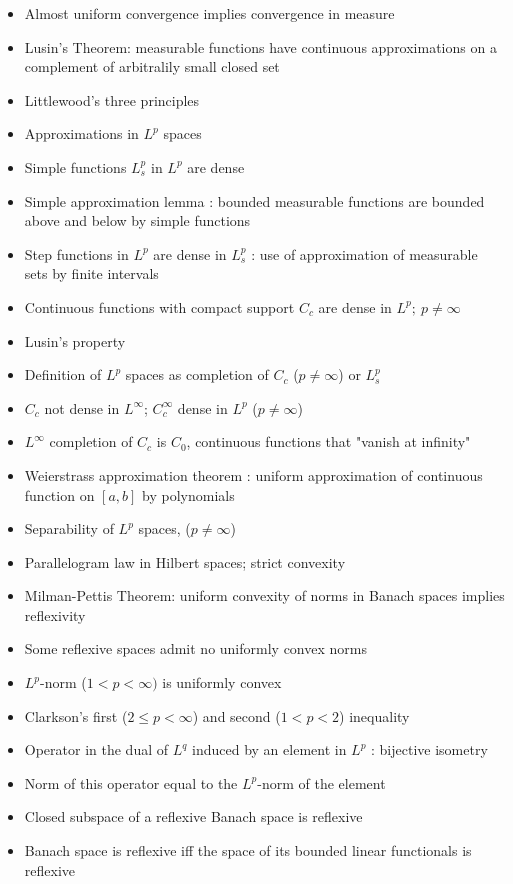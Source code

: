 \documentclass[12pt]{article}
\begin{document}
\begin{itemize}
    \item Almost uniform convergence implies convergence in measure
    \item Lusin's Theorem: measurable functions have continuous approximations on a complement of arbitralily small closed set
    \item Littlewood's three principles
    \item Approximations in $L^p$ spaces
    \item Simple functions $L^p_s$ in $L^p$ are dense
    \item Simple approximation lemma : bounded measurable functions are bounded above and below by simple functions
    \item Step functions in $L^p$ are dense in $L^p_s$ : use of approximation of measurable sets by finite intervals
    \item Continuous functions with compact support $C_c$ are dense in $L^p;\ p\neq \infty$
    \item Lusin's property
    \item Definition of $L^p$ spaces as completion of $C_c$ ($p\neq \infty$) or $L^p_s$
    \item $C_c$ not dense in $L^\infty$; $C_c^\infty$ dense in $L^p$ ($p\neq\infty$)
    \item $L^\infty$ completion of $C_c$ is $C_0$, continuous functions that "vanish at infinity"
    \item Weierstrass approximation theorem : uniform approximation of continuous function on $[a,b]$ by polynomials
    \item Separability of $L^p$ spaces, ($p\neq\infty$)
    \item Parallelogram law in Hilbert spaces; strict convexity
    \item Milman-Pettis Theorem: uniform convexity of norms in Banach spaces implies reflexivity
    \item Some reflexive spaces admit no uniformly convex norms
    \item $L^p$-norm ($1<p<\infty)$ is uniformly convex
    \item Clarkson's first ($2\leq p<\infty$) and second ($1<p<2$) inequality
    \item Operator in the dual of $L^q$ induced by an element in $L^p$ : bijective isometry
    \item Norm of this operator equal to the $L^p$-norm of the element
    \item Closed subspace of a reflexive Banach space is reflexive
    \item Banach space is reflexive iff the space of its bounded linear functionals is reflexive

\end{itemize}
\end{document}
